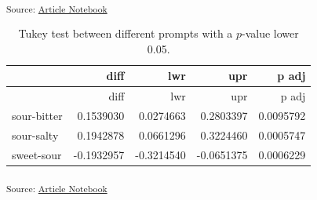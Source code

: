 \documentclass[
  letterpaper,
  DIV=11,
  numbers=noendperiod]{scrartcl}
\begin{document}
\textsubscript{Source:
\href{https://matteospanio.github.io/multimodal-symphony-survey-analysis/index.qmd.html}{Article
Notebook}}

\begin{longtable}[]{@{}lrrrr@{}}
\caption{Tukey test between different prompts with a \(p\)-value lower
0.05.}\tabularnewline
\toprule\noalign{}
& diff & lwr & upr & p adj \\
\midrule\noalign{}
\endfirsthead
\toprule\noalign{}
& diff & lwr & upr & p adj \\
\midrule\noalign{}
\endhead
\bottomrule\noalign{}
\endlastfoot
sour-bitter & 0.1539030 & 0.0274663 & 0.2803397 & 0.0095792 \\
sour-salty & 0.1942878 & 0.0661296 & 0.3224460 & 0.0005747 \\
sweet-sour & -0.1932957 & -0.3214540 & -0.0651375 & 0.0006229 \\
\end{longtable}

\textsubscript{Source:
\href{https://matteospanio.github.io/multimodal-symphony-survey-analysis/index.qmd.html}{Article
Notebook}}
\end{document}
